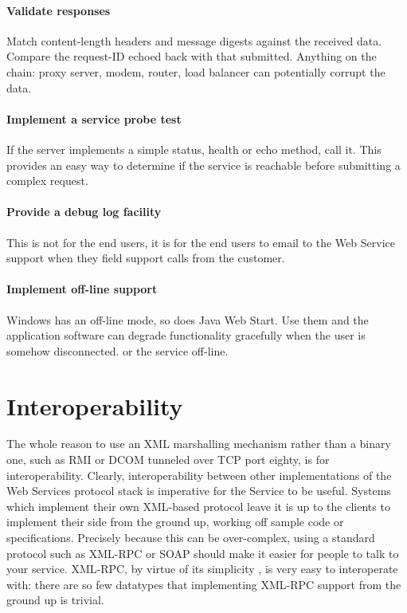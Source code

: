 \documentclass[draft]{report}
\begin{document}
\subsubsection{Validate responses}

Match content-length headers and message digests against the received
data. Compare the request-ID echoed back with that submitted. Anything
on the chain: proxy server, modem, router, load balancer can potentially
corrupt the data.

\subsubsection{Implement a service probe test}

If the server implements a simple status, health or echo method, call
it. This provides an easy way to determine if the service is reachable
before submitting a complex request.

\subsubsection{Provide a debug log facility}

This is not for the end users, it is for the end users to email to the
Web Service support when they field support calls from the customer.

\subsubsection{Implement off-line support}

Windows has an off-line mode, so does Java Web Start. Use them and the
application software can degrade functionality gracefully when the user
is somehow disconnected. or the service off-line.

\chapter{Interoperability}

The whole reason to use an XML marshalling mechanism rather than a
binary one, such as RMI or DCOM tunneled over TCP port eighty, is for
interoperability. Clearly, interoperability between other
implementations of the Web Services protocol stack is imperative for the
Service to be useful. Systems which implement their own XML-based
protocol leave it is up to the clients to implement their side from the
ground up, working off sample code or specifications. Precisely because
this can be over-complex, using a standard protocol such as XML-RPC or
SOAP should make it easier for people to talk to your service. XML-RPC,
by virtue of its simplicity \cite{winer:xmlrpc}, is very easy to
interoperate with: there are so few datatypes that implementing XML-RPC
support from the ground up is trivial.
\end{document}
